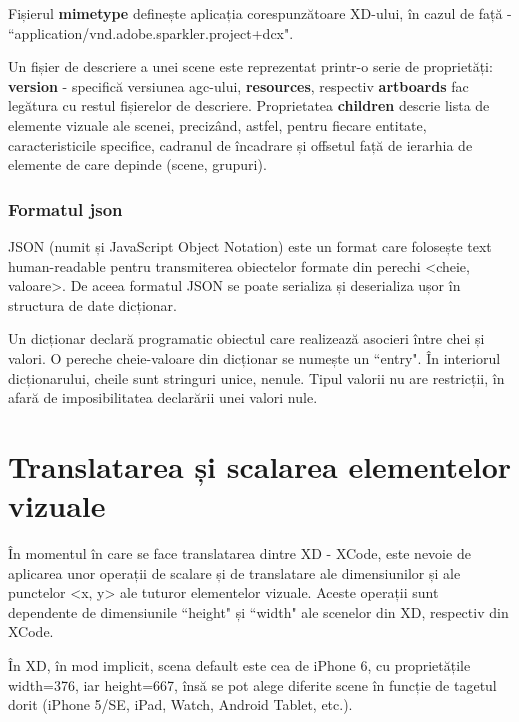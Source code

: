 Fișierul \textbf{mimetype} definește aplicația corespunzătoare XD-ului, în cazul de față - ``application/vnd.adobe.sparkler.project+dcx".

Un fișier de descriere a unei scene este reprezentat printr-o serie de proprietăți:  \textbf{version} - specifică versiunea agc-ului, \textbf{resources}, respectiv \textbf{artboards} fac legătura cu restul fișierelor de descriere. Proprietatea  \textbf{children} descrie lista de elemente vizuale ale scenei, precizând, astfel, pentru fiecare entitate, caracteristicile specifice, cadranul de încadrare și offsetul față de ierarhia de elemente de care depinde (scene, grupuri).

\subsubsection{Formatul json}

JSON (numit și JavaScript Object Notation) este un format care folosește text human-readable pentru transmiterea obiectelor formate din perechi <cheie, valoare>. De aceea formatul JSON se poate serializa și deserializa ușor în structura de date dicționar.

Un dicționar declară programatic obiectul care realizează asocieri între chei și valori. O pereche cheie-valoare din dicționar se numește un ``entry". În interiorul dicționarului, cheile sunt stringuri unice, nenule. Tipul valorii nu are restricții, în afară de imposibilitatea declarării unei valori nule.

\section{Translatarea și scalarea elementelor vizuale}

În momentul în care se face translatarea dintre XD - XCode, este nevoie de aplicarea unor operații de scalare și de translatare ale dimensiunilor și ale punctelor <x, y> ale tuturor elementelor vizuale. Aceste operații sunt dependente de dimensiunile ``height" și ``width" ale scenelor din XD, respectiv din XCode. 

În XD, în mod implicit, scena default este cea de iPhone 6, cu proprietățile width=376, iar height=667, însă se pot alege diferite scene în funcție de tagetul dorit (iPhone 5/SE, iPad, Watch, Android Tablet, etc.). 

